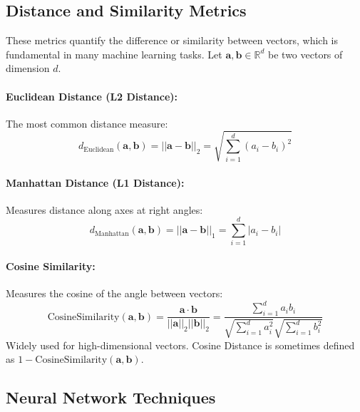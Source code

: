 \begin{appendices}
  \subsection{Distance and Similarity Metrics}
  \label{subsec:distance_metrics} %
  These metrics quantify the difference or similarity between vectors, which is fundamental in many machine learning tasks. Let \( \bm{a}, \bm{b} \in \mathbb{R}^d \) be two vectors of dimension \( d \).

  \paragraph{Euclidean Distance (L2 Distance):}
  \label{eq:euclidean_distance} %
  The most common distance measure:
  \begin{equation}
    d_{\text{Euclidean}}(\bm{a}, \bm{b}) = ||\bm{a} - \bm{b}||_2 = \sqrt{\sum_{i=1}^d (a_i - b_i)^2}
  \end{equation}

  \paragraph{Manhattan Distance (L1 Distance):}
  Measures distance along axes at right angles:
  \begin{equation}
    d_{\text{Manhattan}}(\bm{a}, \bm{b}) = ||\bm{a} - \bm{b}||_1 = \sum_{i=1}^d |a_i - b_i| %
  \end{equation}

  \paragraph{Cosine Similarity:}
  Measures the cosine of the angle between vectors:
  \begin{equation}
    \text{CosineSimilarity}(\bm{a}, \bm{b}) = \frac{\bm{a} \cdot \bm{b}}{||\bm{a}||_2 ||\bm{b}||_2} = \frac{\sum_{i=1}^d a_i b_i}{\sqrt{\sum_{i=1}^d a_i^2} \sqrt{\sum_{i=1}^d b_i^2}} %
  \end{equation}
  Widely used for high-dimensional vectors. Cosine Distance is sometimes defined as \( 1 - \text{CosineSimilarity}(\bm{a}, \bm{b}) \).

  \subsection{Neural Network Techniques}
  \label{subsec:nn_techniques_app} %


\end{appendices}
